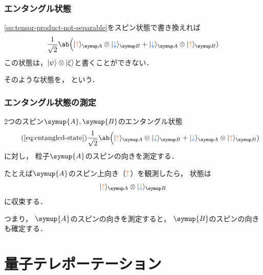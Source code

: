 \documentclass[
    10pt,
    ]{sotsu-beamer}
\newcommand{\bitone}{\mathcolor{fire}{\uparrow}}
\newcommand{\bittwo}{\mathcolor{water}{\downarrow}}
\begin{document}
\begin{frame}
    \frametitle{エンタングル状態}
    
    \eqref{eq:tensor-product-not-separable}をスピン状態で書き換えれば
    \begin{equation}
        \label{eq:entangled-state}
        \frac{1}{\sqrt{2}} \ab\Big( 
            \ket{\bitone}<A> \otimes \ket{\bittwo}<B>
            + \ket{\bittwo}<A> \otimes \ket{\bitone}<B>
        )
    \end{equation}
    この状態は，$\ket{\psi} \otimes \ket{\xi}$と書くことができない．

    そのような状態を，
    という．
    
\end{frame}


\begin{frame}
    \frametitle{エンタングル状態の測定}

    2つのスピン$\symup{A}, \symup{B}$のエンタングル状態
    \begin{equation*}
        \tag{\ref*{eq:entangled-state}}
        \frac{1}{\sqrt{2}} \ab\Big( 
            \ket{\bitone}<A> \otimes \ket{\bittwo}<B>
            + \ket{\bittwo}<A> \otimes \ket{\bitone}<B>
        )
    \end{equation*}
    に対し，
    粒子$\symup{A}$のスピンの向きを測定する．

    \pause

    たとえば$\symup{A}$のスピン上向き（$\bitone$）を観測したら，
    状態は
    \begin{equation*}
            \ket{\bitone}<A> \otimes \ket{\bittwo}<B>
    \end{equation*}
    に収束する．

    つまり，
    \alert{$\symup{A}$のスピンの向きを測定すると，
    $\symup{B}$のスピンの向きも確定する．}

\end{frame}


\section{量子テレポーテーション}
\end{document}

